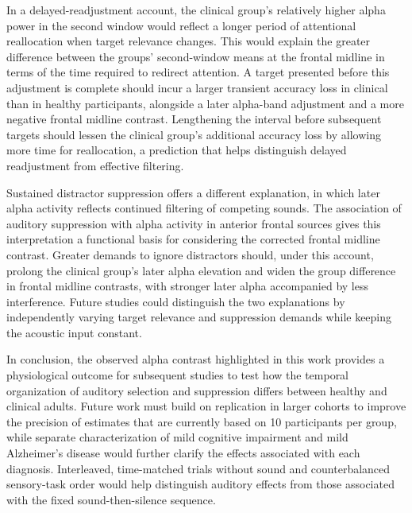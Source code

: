 \documentclass[11pt,letterpaper]{article}
\begin{document}
In a delayed-readjustment account, the clinical group's relatively higher alpha power in the second window would reflect a longer period of attentional reallocation when target relevance changes. This would explain the greater difference between the groups' second-window means at the frontal midline in terms of the time required to redirect attention. A target presented before this adjustment is complete should incur a larger transient accuracy loss in clinical than in healthy participants, alongside a later alpha-band adjustment and a more negative frontal midline contrast. Lengthening the interval before subsequent targets should lessen the clinical group's additional accuracy loss by allowing more time for reallocation, a prediction that helps distinguish delayed readjustment from effective filtering.

Sustained distractor suppression offers a different explanation, in which later alpha activity reflects continued filtering of competing sounds. The association of auditory suppression with alpha activity in anterior frontal sources \cite{wostmann} gives this interpretation a functional basis for considering the corrected frontal midline contrast. Greater demands to ignore distractors should, under this account, prolong the clinical group's later alpha elevation and widen the group difference in frontal midline contrasts, with stronger later alpha accompanied by less interference. Future studies could distinguish the two explanations by independently varying target relevance and suppression demands while keeping the acoustic input constant.

In conclusion, the observed alpha contrast highlighted in this work provides a physiological outcome for subsequent studies to test how the temporal organization of auditory selection and suppression differs between healthy and clinical adults. Future work must build on replication in larger cohorts to improve the precision of estimates that are currently based on 10 participants per group, while separate characterization of mild cognitive impairment and mild Alzheimer's disease would further clarify the effects associated with each diagnosis. Interleaved, time-matched trials without sound and counterbalanced sensory-task order would help distinguish auditory effects from those associated with the fixed sound-then-silence sequence.
\end{document}

